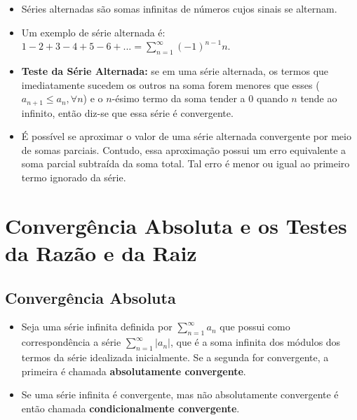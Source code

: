 		\begin{itemize}
			
			\item Séries alternadas são somas infinitas de números cujos sinais se alternam.
			
			\item Um exemplo de série alternada é: $1 - 2 + 3 - 4 + 5 - 6 + ... = \sum_{n=1}^{\infty} (-1)^{n-1}n$.
			
			\item \textbf{Teste da Série Alternada: }se em uma série alternada, os termos que imediatamente sucedem os outros na soma forem menores que esses ($a_{n + 1} \le a_{n}, \forall  n$) e o $n$-ésimo termo da soma tender a 0 quando $n$ tende ao infinito, então diz-se que essa série é convergente.
			
			\item É possível se aproximar o valor de uma série alternada convergente por meio de somas parciais. Contudo, essa aproximação possui um erro equivalente a soma parcial subtraída da soma total. Tal erro é menor ou igual ao primeiro termo ignorado da série.
			
		\end{itemize}
	
	\section{Convergência Absoluta e os Testes da Razão e da Raiz}
	
		\subsection{Convergência Absoluta}
	
			\begin{itemize}
				
				\item Seja uma série infinita definida por $\sum_{n = 1}^{\infty} a_{n}$ que possui como correspondência a série $\sum_{n = 1}^{\infty} |a_{n}|$, que é a soma infinita dos módulos dos termos da série idealizada inicialmente. Se a segunda for convergente, a primeira é chamada \textbf{absolutamente convergente}.
				
				\item Se uma série infinita é convergente, mas não absolutamente convergente é então chamada \textbf{condicionalmente convergente}.
				
			\end{itemize}
	
